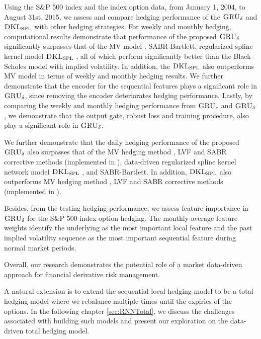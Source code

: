 \documentclass[letterpaper,12pt,titlepage,oneside,final]{book}
\numberwithin{equation}{section}
\theoremstyle{definition}
\newcommand{\model}{\textsc{GRU}_\delta}
\newcommand{\DKLs}{\bf\textsc{DKL}_{\text{SPL}}}
\begin{document}
Using the S\&P 500 index and the index option data,  from January 1, 2004, to  August 31st, 2015, we assess and compare
hedging performance of the  $\model$ and $\DKLs$ with other hedging strategies.
 For weekly and monthly hedging, computational results demonstrate that performance of the proposed $\model$  significantly surpasses that of the MV model , SABR-Bartlett, regularized spline kernel model $\DKLs$ , all of which perform significantly better than the Black–Scholes model with implied volatility.
In addition, the $\DKLs$ also outperforms MV model in terms of weekly and monthly hedging results.
We further demonstrate that the encoder for the sequential features plays a significant role in $\model$, since removing the encoder deteriorates hedging performance.
Lastly, by comparing the weekly and monthly hedging performance from $\textsc{GRU}_{c}$ and $\model$, we demonstrate that the output gate,  robust loss and training procedure, also play  a significant role in $\model$.

We further demonstrate that the daily hedging performance of the proposed $\model$  also surpasses that of the MV hedging method , LVF and SABR corrective methods  (implemented in \cite{hulloptimal}), data-driven regularized spline kernel network model $\DKLs$ , and SABR-Bartlett. In addition, $\DKLs$ also outperforms MV hedging method , LVF and SABR corrective methods  (implemented in \cite{hulloptimal}).

Besides, from the testing hedging performance, we assess feature importance in  $\model$  for the S\&P 500 index  option hedging. The monthly average feature weights identify the underlying as the most important local feature and the past implied volatility sequence as the most important sequential feature during normal market periods.

Overall, our research demonstrates the potential role of a market data-driven approach for financial derivative risk management.

A natural extension  is to extend the sequential local hedging model to be a total hedging model where we rebalance multiple times until the expiries of the options. In the following chapter \ref{sec:RNNTotal}, we discuss the challenges associated with building such models and present our exploration on the data-driven total hedging model.
\end{document}

